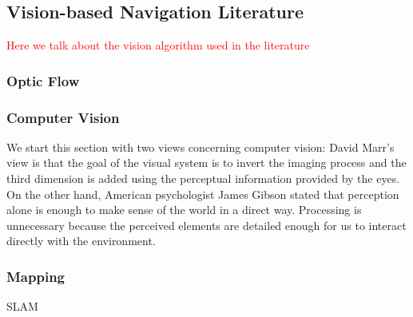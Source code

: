 \subsection{Vision-based Navigation Literature}
\label{subsec:lit_vision}
\textcolor{red}{Here we talk about the vision algorithm used in the literature}
\subsubsection{Optic Flow}
\subsubsection{Computer Vision}
We start this section with two views concerning computer vision: David Marr's view is that the goal of the visual system is to invert the imaging process and the third dimension is added using the perceptual information provided by the eyes. On the other hand, American psychologist James Gibson stated that perception alone is enough to make sense of the world in a direct way. Processing is unnecessary because the perceived elements are detailed enough for us to interact directly with the environment.
\subsubsection{Mapping} SLAM

